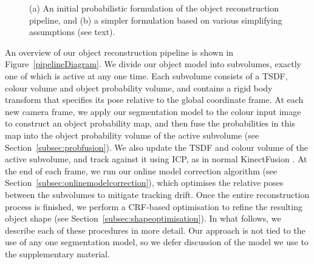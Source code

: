 \begin{figure}[!p]
	\centering
	\hspace{12mm}%
	\caption{(a) An initial probabilistic formulation of the object reconstruction pipeline, and (b) a simpler formulation based on various simplifying assumptions (see text).}
\end{figure}

An overview of our object reconstruction pipeline is shown in Figure~\ref{pipelineDiagram}. We divide our object model into subvolumes, exactly one of which is active at any one time. Each subvolume consists of a TSDF, colour volume and object probability volume, and contains a rigid body transform that specifies its pose relative to the global coordinate frame. At each new camera frame, we apply our segmentation model to the colour input image to construct an object probability map, and then fuse the probabilities in this map into the object probability volume of the active subvolume (see Section~\ref{subsec:probfusion}). We also update the TSDF and colour volume of the active subvolume, and track against it using ICP, as in normal KinectFusion \cite{Newcombe2011}. At the end of each frame, we run our online model correction algorithm (see Section~\ref{subsec:onlinemodelcorrection}), which optimises the relative poses between the subvolumes to mitigate tracking drift. Once the entire reconstruction process is finished, we perform a CRF-based optimisation to refine the resulting object shape (see Section~\ref{subsec:shapeoptimisation}). In what follows, we describe each of these procedures in more detail. Our approach is not tied to the use of any one segmentation model, so we defer discussion of the model we use to the supplementary material.

